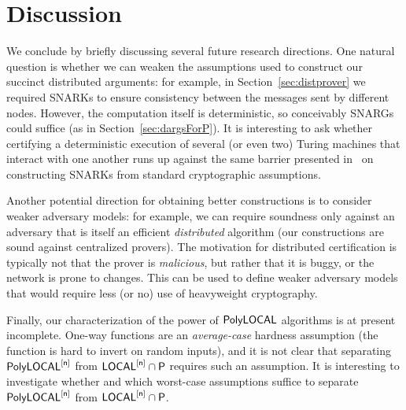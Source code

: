 \section{Discussion}
\label{sec:discuss}

We conclude by briefly discussing several future research directions.
One natural question is whether we can weaken the assumptions used to construct our
succinct distributed arguments: for example, in Section~\ref{sec:distprover}
we required SNARKs to ensure consistency between the messages sent by different nodes.
However, the computation itself is deterministic, so conceivably SNARGs could suffice
(as in Section~\ref{sec:dargsForP}).
It is interesting to ask whether certifying a deterministic execution of several (or even two)
Turing machines that interact with one another runs up against the same barrier presented in~\cite{gentry2011separating}
on constructing SNARKs from standard cryptographic assumptions.

Another potential direction for obtaining better constructions is to consider weaker adversary models:
for example, we can require soundness only against an adversary that is itself an efficient \emph{distributed}
algorithm (our constructions are sound against centralized provers).
The motivation for distributed certification is typically not that the prover is \emph{malicious},
but rather that it is buggy, or the network is prone to changes.
This can be used to define weaker adversary models that would require less (or no) use of heavyweight
cryptography.

Finally, our characterization of the power of ${\mathsf{PolyLOCAL}}$ algorithms
is at present incomplete.
One-way functions are an \emph{average-case} hardness assumption
(the function is hard to invert on random inputs),
and it is not clear that separating $\mathsf{PolyLOCAL}^{[\mathsf{n}]}$ from ${\mathsf{LOCAL}}^{[\mathsf{n}]} \cap {\mathsf{P}}$
requires such an assumption.
It is interesting to investigate whether and which worst-case
assumptions suffice to separate $\mathsf{PolyLOCAL}^{[\mathsf{n}]}$ from ${\mathsf{LOCAL}}^{[\mathsf{n}]} \cap {\mathsf{P}}$.
